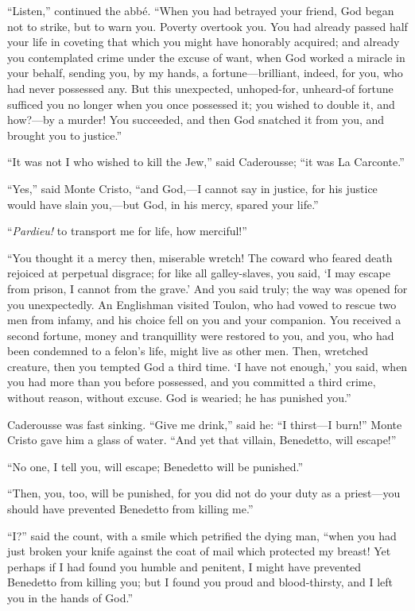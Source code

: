 “Listen,” continued the abbé. “When you had betrayed your friend, God
began not to strike, but to warn you. Poverty overtook you. You had
already passed half your life in coveting that which you might have
honorably acquired; and already you contemplated crime under the excuse
of want, when God worked a miracle in your behalf, sending you, by my
hands, a fortune—brilliant, indeed, for you, who had never possessed
any. But this unexpected, unhoped-for, unheard-of fortune sufficed you
no longer when you once possessed it; you wished to double it, and
how?—by a murder! You succeeded, and then God snatched it from you, and
brought you to justice.”

“It was not I who wished to kill the Jew,” said Caderousse; “it was La
Carconte.”

“Yes,” said Monte Cristo, “and God,—I cannot say in justice, for his
justice would have slain you,—but God, in his mercy, spared your life.”

“\textit{Pardieu!} to transport me for life, how merciful!”

“You thought it a mercy then, miserable wretch! The coward who feared
death rejoiced at perpetual disgrace; for like all galley-slaves, you
said, ‘I may escape from prison, I cannot from the grave.’ And you said
truly; the way was opened for you unexpectedly. An Englishman visited
Toulon, who had vowed to rescue two men from infamy, and his choice
fell on you and your companion. You received a second fortune, money
and tranquillity were restored to you, and you, who had been condemned
to a felon’s life, might live as other men. Then, wretched creature,
then you tempted God a third time. ‘I have not enough,’ you said, when
you had more than you before possessed, and you committed a third
crime, without reason, without excuse. God is wearied; he has punished
you.”

Caderousse was fast sinking. “Give me drink,” said he: “I thirst—I
burn!” Monte Cristo gave him a glass of water. “And yet that villain,
Benedetto, will escape!”

“No one, I tell you, will escape; Benedetto will be punished.”

“Then, you, too, will be punished, for you did not do your duty as a
priest—you should have prevented Benedetto from killing me.”

“I?” said the count, with a smile which petrified the dying man, “when
you had just broken your knife against the coat of mail which protected
my breast! Yet perhaps if I had found you humble and penitent, I might
have prevented Benedetto from killing you; but I found you proud and
blood-thirsty, and I left you in the hands of God.”

